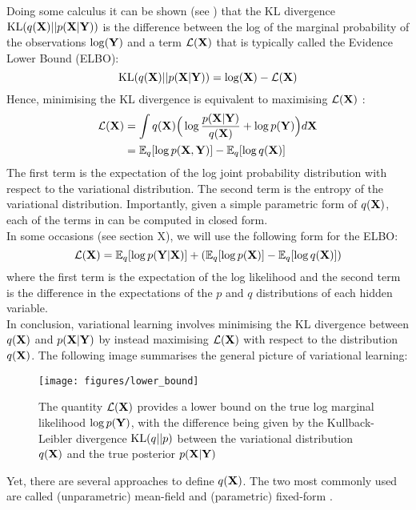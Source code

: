{Doing some calculus it can be shown (see \cite{Bishop2006,Murphy}) that the KL divergence ${\rm KL}(q({\bf X})||p({\bf X}|{\bf Y}))$ is the difference between the log of the marginal probability of the observations $\log({\bf Y})$ and a term $\mathcal{L}({\bf X})$ that is typically called the Evidence Lower Bound (ELBO):
\[
	{\rm KL}(q({\bf X})||p({\bf X}|{\bf Y})) = \log({\bf X}) - \mathcal{L}({\bf X})
\]
Hence, minimising the KL divergence is equivalent to maximising $\mathcal{L}({\bf X})$ :
\begin{align} \label{eq_elbo1} \begin{split}
	\mathcal{L}({\bf X}) &= \int q({\bf X}) \Big( \log \frac{p({\bf X}|{\bf Y})}{q({\bf X})} + \log p({\bf Y}) \Big) d{\bf X} \\
	&= \mathbb{E}_q [\log p({\bf X},{\bf Y})] - \mathbb{E}_q [\log q({\bf X})]
\end{split} \end{align}
The first term is the expectation of the log joint probability distribution with respect to the variational distribution. The second term is the entropy of the variational distribution.
Importantly, given a simple parametric form of $q({\bf X})$, each of the terms in  can be computed in closed form.\\
In some occasions (see section X), we will use the following form for the ELBO:
\begin{equation} \label{eq_elbo2}
	\mathcal{L}({\bf X}) = \mathbb{E}_q [\log p({\bf Y}|{\bf X})] + (\mathbb{E}_q [\log p({\bf X})] - \mathbb{E}_q [\log q({\bf X})])
\end{equation}
where the first term is the expectation of the log likelihood and the second term is the difference in the expectations of the $p$ and $q$ distributions of each hidden variable.\\

In conclusion, variational learning involves minimising the KL divergence between $q({\bf X})$ and $p({\bf X}|{\bf Y})$ by instead maximising $\mathcal{L}({\bf X})$ with respect to the distribution $q({\bf X})$. The following image summarises the general picture of variational learning:
\begin{figure}[H]
	\centering
	\texttt{[image: figures/lower\_bound]}
	\caption{The quantity $\mathcal{L}({\bf X})$ provides a lower bound on the true log marginal likelihood $\log p({\bf Y})$, with the difference being given by the Kullback-Leibler divergence ${\rm KL}(q||p)$ between the variational distribution $q({\bf X})$ and the true posterior $p({\bf X}|{\bf Y})$}
	\label{fig:ELBO}
\end{figure}
 Yet, there are several approaches to define $q({\bf X})$. The two most commonly used are called (unparametric) mean-field and (parametric) fixed-form \cite{Zhang2017,Blei2016}.

}
